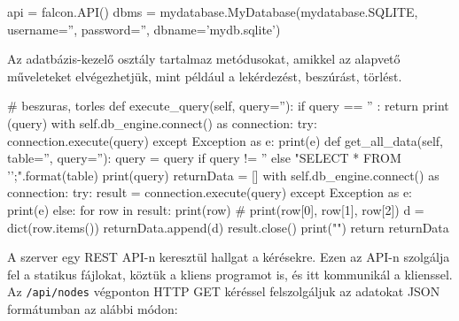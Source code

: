 \begin{python}
api = falcon.API()
dbms = mydatabase.MyDatabase(mydatabase.SQLITE, username='', password='', 
dbname='mydb.sqlite')
\end{python}

Az adatbázis-kezelő osztály tartalmaz metódusokat, amikkel az alapvető műveleteket elvégezhetjük, mint például a lekérdezést, beszúrást, törlést.

\begin{python}
# beszuras, torles
    def execute_query(self, query=''):
            if query == '' : return
            print (query)
            with self.db_engine.connect() as connection:
                try:
                    connection.execute(query)
                except Exception as e:
                    print(e)
def get_all_data(self, table='', query=''):
            query = query if query != '' else "SELECT * 
FROM '{}';".format(table)
            print(query)
            returnData = []
            with self.db_engine.connect() as connection:
                try:
                    result = connection.execute(query)
                except Exception as e:
                    print(e)
                else:   
                    for row in result:
                        print(row) # print(row[0], row[1], row[2])
                        d = dict(row.items())
                        returnData.append(d)
                    result.close()
            print("\n")       
            return returnData
\end{python}

A szerver egy REST API-n keresztül hallgat a kérésekre. Ezen az API-n szolgálja fel a statikus fájlokat, köztük a kliens programot is, és itt kommunikál a klienssel. Az \texttt{/api/nodes} végponton HTTP GET kéréssel felszolgáljuk az adatokat JSON formátumban az alábbi módon:

\begin{json}
\end{json}

